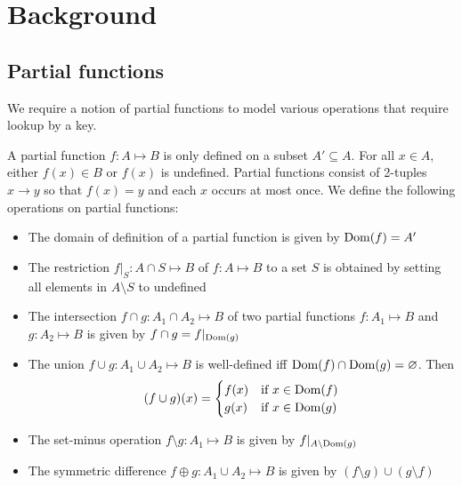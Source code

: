 \chapter{Background}
\label{chap:bg}
\section{Partial functions}
We require a notion of partial functions to model various operations that require lookup by a key.
\begin{definition}
\label{def:partial}
A partial function $f : A \mapsto B$ is only defined on a subset $A' \subseteq A$. For all $x \in A$, either $f(x) \in B$ or $f(x)$ is undefined.
Partial functions consist of 2-tuples $x \to y$ so that $f(x) = y$ and each $x$ occurs at most once. We define the following operations on partial functions:
\begin{itemize}
    \item The domain of definition of a partial function is given by $\operatorname{Dom}(f) = A'$
    \item The restriction $f|_S : A \cap S \mapsto B$ of $f : A \mapsto B$ to a set $S$ is obtained by setting all elements in $A\setminus S$ to undefined
    \item The intersection $f \cap g : A_1 \cap A_2 \mapsto B$  of two partial functions $f : A_1 \mapsto B$ and $g : A_2 \mapsto B$ is given by $f \cap g = f|_{\operatorname{Dom}(g)}$
    \item The union $f \cup g : A_1 \cup A_2 \mapsto B$ is well-defined iff $\operatorname{Dom}(f) \cap \operatorname{Dom}(g) = \varnothing$. Then \[ (f \cup g)(x) = \begin{cases} 
    f(x) & \text{if } x \in \operatorname{Dom}(f) \\
    g(x) & \text{if } x \in \operatorname{Dom}(g) \\
    \end{cases} \]
    \item The set-minus operation $f \setminus g : A_1 \mapsto B$ is given by $f|_{A \setminus \operatorname{Dom}(g)}$
    \item The symmetric difference $f \oplus g : A_1 \cup A_2 \mapsto B$ is given by $(f \setminus g) \cup (g \setminus f)$
\end{itemize}


\end{definition}
